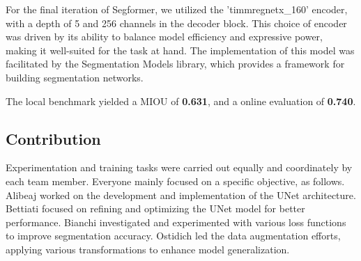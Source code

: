 \documentclass[11pt]{article}
\begin{document}
\begin{multicols}{2}
        For the final iteration of Segformer, we utilized the 'timm\-regnetx\_160' encoder, with a depth of 5 and 256 channels in the decoder block. This choice of encoder was driven by its ability to balance model efficiency and expressive power, making it well-suited for the task at hand. The implementation of this model was facilitated by the Segmentation Models library\cite{qubvel2024}, which provides a framework for building segmentation networks.

        The local benchmark yielded a MIOU of \textbf{0.631}, and a online evaluation of \textbf{0.740}.        \subsection{Contribution}

        Experimentation and training tasks were carried out equally and coordinately by each team member.
        Everyone mainly focused on a specific objective, as follows.
        Alibeaj worked on the development and implementation of the UNet architecture.
        Bettiati focused on refining and optimizing the UNet model for better performance.
        Bianchi investigated and experimented with various loss functions to improve segmentation accuracy.
        Ostidich led the data augmentation efforts, applying various transformations to enhance model generalization.

        
        

    \end{multicols}
\end{document}
